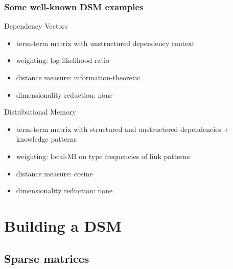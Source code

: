 \documentclass[t]{beamer} %
\begin{document}
\begin{frame}
  \frametitle{Some well-known DSM examples}

  \ungap
  \begin{block}{Dependency Vectors \citep{Pado:Lapata:07}}
    \begin{itemize}
    \item term-term matrix with unstructured dependency context
    \item weighting: log-likelihood ratio
    \item distance measure: information-theoretic \citep{Lin:98a}
    \item dimensionality reduction: none
    \end{itemize}
  \end{block}
  
  \pause
  \begin{block} {Distributional Memory \citep{Baroni:Lenci:10}}
    \begin{itemize}
    \item term-term matrix with structured and unstructered dependencies + knowledge patterns
    \item weighting: local-MI on type frequencies of link patterns
    \item distance measure: cosine
    \item dimensionality reduction: none
    \end{itemize}
  \end{block}
\end{frame}

\section{Building a DSM}

\subsection{Sparse matrices}
\end{document}
